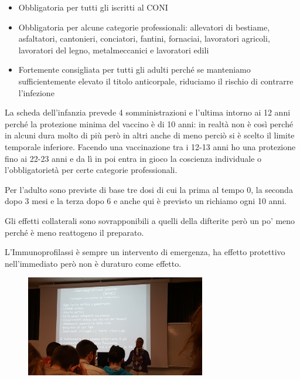 \begin{itemize}
\item
  Obbligatoria per tutti gli iscritti al CONI
\item
  Obbligatoria per alcune categorie professionali: allevatori di
  bestiame, asfaltatori, cantonieri, conciatori, fantini, fornaciai,
  lavoratori agricoli, lavoratori del legno, metalmeccanici e lavoratori
  edili
\item
  Fortemente consigliata per tutti gli adulti perché se manteniamo
  sufficientemente elevato il titolo anticorpale, riduciamo il rischio
  di contrarre l'infezione
\end{itemize}
  La scheda dell'infanzia prevede 4 somministrazioni e l'ultima intorno
  ai 12 anni perché la protezione minima del vaccino è di 10 anni: in
  realtà non è così perché in alcuni dura molto di più però in altri
  anche di meno perciò si è scelto il limite temporale inferiore.
  Facendo una vaccinazione tra i 12-13 anni ho una protezione fino ai
  22-23 anni e da lì in poi entra in gioco la coscienza individuale o
  l'obbligatorietà per certe categorie professionali.

  Per l'adulto sono previste di base tre dosi di cui la prima al tempo
  0, la seconda dopo 3 mesi e la terza dopo 6 e anche qui è previsto un
  richiamo ogni 10 anni.

  Gli effetti collaterali sono sovrapponibili a quelli della difterite
  però un po' meno perché è meno reattogeno il preparato.

  L'Immunoprofilassi è sempre un intervento di emergenza, ha effetto
  protettivo nell'immediato però non è duraturo come effetto.

  \begin{figure}[!ht]
\centering
\includegraphics[width=0.7\textwidth]{06/image8.jpeg}
\end{figure}

